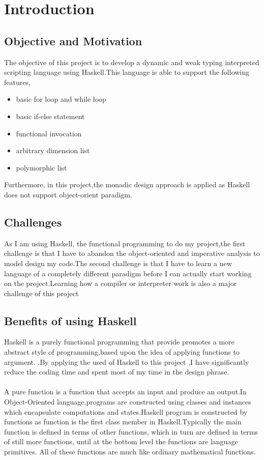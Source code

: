 \chapter{Introduction}
\section{Objective and Motivation}
The objective of this project is to develop a dynamic and weak typing interpreted scripting language using Haskell.This language is able to support the following features,
\begin{itemize}
\item basic for loop and while loop
\item basic if-else statement
\item functional invocation 
\item arbitrary dimension list
\item polymorphic list
\end{itemize}

Furthermore, in this project,the monadic design approach is applied as Haskell does not support object-orient paradigm.
\section{Challenges}
As I am using Haskell, the functional programming to do my project,the first challenge is that I have to abandon the object-oriented and imperative analysis to model design my code.The second challenge is that I have to learn a new language of a completely different paradigm before I can actually start working on the project.Learning how a compiler or interpreter work is also a major challenge of this project

\section{Benefits of using Haskell} 
Haskell is a purely functional programming that provide promotes a more
abstract style of programming,based upon the idea of applying functions to
argument.\cite{pure} .By applying the used of Haskell to this project ,I have significantly reduce the coding time and spent most of my time in the design phrase.
\\
\\
A pure function is a function that accepts an input and produce an output.In Object-Oriented language,programs are constructed using classes and instances which encapsulate computations and states.Haskell program is constructed by functions as function is the first class member in Haskell.Typically the main function is defined in terms of other functions, which in turn are defined in terms of still more functions, until at the bottom level the functions are language primitives. All of these functions are much like ordinary mathematical functions.  \cite{why} \cite{overloading}
